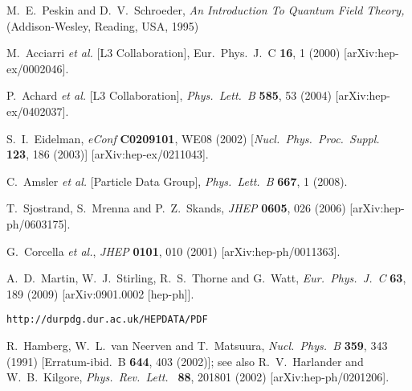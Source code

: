\documentclass{ws-procs9x6}
\begin{document}
\begin{thebibliography}{99}

  M.~E.~Peskin and D.~V.~Schroeder,
{\it An Introduction To Quantum Field Theory,}
(Addison-Wesley, Reading, USA, 1995)

  M.~Acciarri {\it et al.}  [L3 Collaboration],
  Eur.\ Phys.\ J.\  C {\bf 16}, 1 (2000)
  [arXiv:hep-ex/0002046].
  
  P.~Achard {\it et al.}  [L3 Collaboration],
{\em  Phys.\ Lett.\  B} {\bf 585}, 53 (2004)
  [arXiv:hep-ex/0402037].

  S.~I.~Eidelman,
{\em  eConf} {\bf C0209101}, WE08 (2002)
  [{\em Nucl.\ Phys.\ Proc.\ Suppl.\ } {\bf 123}, 186 (2003)]
  [arXiv:hep-ex/0211043].

  C.~Amsler {\it et al.}  [Particle Data Group],
  {\em Phys.\ Lett.\  B} {\bf 667}, 1 (2008).

  T.~Sjostrand, S.~Mrenna and P.~Z.~Skands,
  {\em JHEP} {\bf 0605}, 026 (2006)
  [arXiv:hep-ph/0603175].

  G.~Corcella {\it et al.},
  {\em JHEP} {\bf 0101}, 010 (2001)
  [arXiv:hep-ph/0011363].

  A.~D.~Martin, W.~J.~Stirling, R.~S.~Thorne and G.~Watt,
 {\em Eur.\ Phys.\ J.\  C} {\bf 63}, 189 (2009)
  [arXiv:0901.0002 [hep-ph]].

{\tt http://durpdg.dur.ac.uk/HEPDATA/PDF}

  R.~Hamberg, W.~L.~van Neerven and T.~Matsuura,
  {\em Nucl.\ Phys.\  B} {\bf 359}, 343 (1991)
  [Erratum-ibid.\  B {\bf 644}, 403 (2002)]; see also
  R.~V.~Harlander and W.~B.~Kilgore,
  {\em Phys.\ Rev.\ Lett.\ } {\bf 88}, 201801 (2002)
  [arXiv:hep-ph/0201206].
  

\end{thebibliography}
\end{document}
